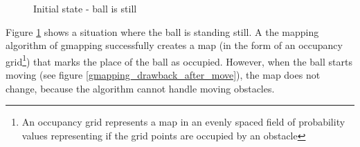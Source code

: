 \begin{figure}[!ht]
\centering
{}
\caption{Initial state - ball is still}
\label{gmapping_drawback_before_move}
\end{figure}

Figure \ref{gmapping_drawback_before_move} shows a situation where the ball is standing still. A the mapping algorithm of gmapping successfully creates a map (in the form of an occupancy grid\footnote{An occupancy grid represents a map in an evenly spaced field of probability values representing if the grid points are occupied by an obstacle}) that marks the place of the ball as occupied. However, when the ball starts moving (see figure \ref{gmapping_drawback_after_move}), the map does not change, because the algorithm cannot handle moving obstacles.

